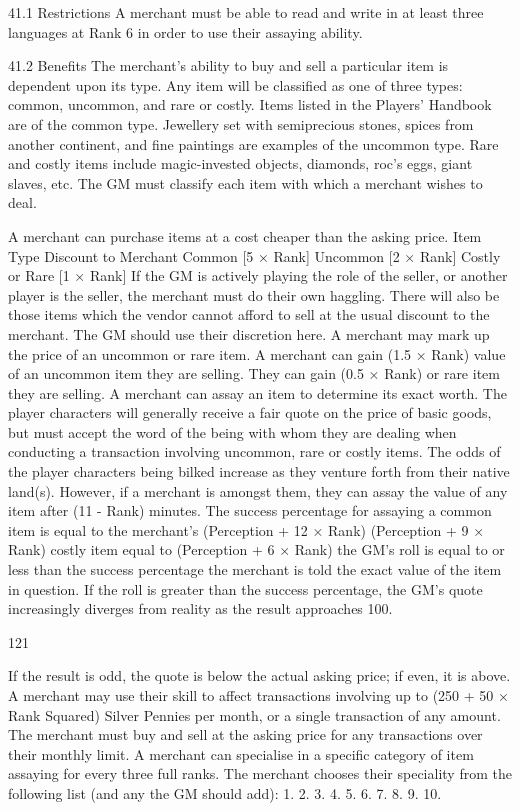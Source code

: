 \documentclass[a4paper]{article}
\begin{document}
\begin{multicols}{3}
41.1 Restrictions
A merchant must be able to read and write in at
least three languages at Rank 6 in order to use their
assaying ability.

41.2 Benefits
The merchant’s ability to buy and sell a particular item is dependent upon its type.
Any item will be classified as one of three types:
common, uncommon, and rare or costly. Items
listed in the Players’ Handbook are of the common
type. Jewellery set with semiprecious stones, spices
from another continent, and fine paintings are
examples of the uncommon type. Rare and costly
items include magic-invested objects, diamonds,
roc’s eggs, giant slaves, etc. The GM must classify
each item with which a merchant wishes to deal.

A merchant can purchase items at a cost
cheaper than the asking price.
Item Type
Discount to Merchant
Common
[5 × Rank] %
Uncommon
[2 × Rank] %
Costly or Rare [1 × Rank] %
If the GM is actively playing the role of the seller,
or another player is the seller, the merchant must
do their own haggling. There will also be those
items which the vendor cannot afford to sell at the
usual discount to the merchant. The GM should use
their discretion here.
A merchant may mark up the price of an uncommon or rare item.
A merchant can gain (1.5 × Rank)%
value of an uncommon item they are selling. They
can gain (0.5 × Rank)%
or rare item they are selling.
A merchant can assay an item to determine its
exact worth.
The player characters will generally receive a fair
quote on the price of basic goods, but must accept
the word of the being with whom they are dealing
when conducting a transaction involving uncommon, rare or costly items. The odds of the player
characters being bilked increase as they venture
forth from their native land(s). However, if a merchant is amongst them, they can assay the value of
any item after (11 - Rank) minutes.
The success percentage for assaying a common
item is equal to the merchant’s (Perception + 12 ×
Rank)%
(Perception + 9 × Rank)%
costly item equal to (Perception + 6 × Rank)%
the GM’s roll is equal to or less than the success
percentage the merchant is told the exact value of
the item in question. If the roll is greater than the
success percentage, the GM’s quote increasingly
diverges from reality as the result approaches 100.

121

If the result is odd, the quote is below the actual
asking price; if even, it is above.
A merchant may use their skill to affect transactions involving up to (250 + 50 × Rank Squared)
Silver Pennies per month, or a single transaction of
any amount.
The merchant must buy and sell at the asking price
for any transactions over their monthly limit.
A merchant can specialise in a specific category
of item assaying for every three full ranks.
The merchant chooses their speciality from the
following list (and any the GM should add):
1.
2.
3.
4.
5.
6.
7.
8.
9.
10.


\end{multicols}
\end{document}
